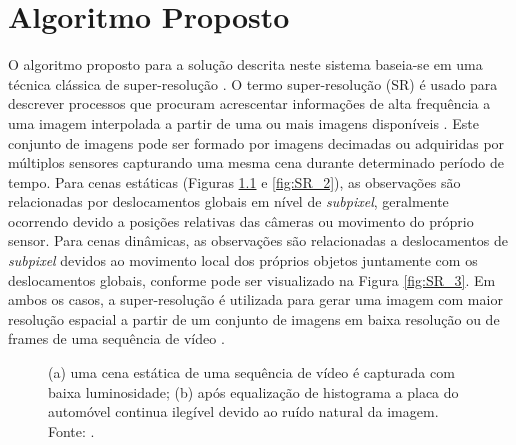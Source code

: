 \chapter[Algoritmo Proposto]{Algoritmo Proposto}

O algoritmo proposto para a solução descrita neste sistema baseia-se em uma técnica clássica de super-resolução \cite{garcia2013tecnicas}. O termo super-resolução (SR) é usado para descrever processos que procuram acrescentar informações de alta frequência a uma imagem interpolada a partir de uma ou mais imagens disponíveis \cite{baker2002limits,park2003super,farsiu2004advances}. Este conjunto de imagens pode ser formado por imagens decimadas ou adquiridas por múltiplos sensores capturando uma mesma cena durante determinado período de tempo. Para cenas estáticas (Figuras \ref{fig:SR_1} e \ref{fig:SR_2}), as observações são relacionadas por deslocamentos globais em nível de \textit{subpixel}, geralmente ocorrendo devido a posições relativas das câmeras ou movimento do próprio sensor. Para cenas dinâmicas, as observações são relacionadas a deslocamentos de \textit{subpixel} devidos ao movimento local dos próprios objetos juntamente com os deslocamentos globais, conforme pode ser visualizado na Figura \ref{fig:SR_3}. Em ambos os casos, a super-resolução é utilizada para gerar uma imagem com maior resolução espacial a partir de um conjunto de imagens em baixa resolução ou de frames de uma sequência de vídeo \cite{figueira2013super}\cite{milanfar2010super}.
\\
\begin{figure}[h]
    \centering
    \qquad
    \caption{(a) uma cena estática de uma sequência de vídeo é capturada com baixa luminosidade; (b) após equalização de histograma a placa do automóvel continua ilegível devido ao ruído natural da imagem. Fonte: \cite{kang2000digital}. }%
	    \label{fig:SR_1}
\end{figure}

